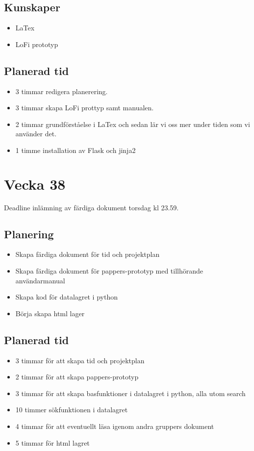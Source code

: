 \documentclass{TDP003mall}
\begin{document}
\subsection{Kunskaper}
\begin{itemize}
\item LaTex
\item LoFi prototyp
\end{itemize}

\subsection{Planerad tid}
\begin{itemize}
\item 3 timmar redigera planerering. 
\item 3 timmar skapa LoFi prottyp samt manualen. 
\item 2 timmar grundförståelse i LaTex och sedan lär vi oss mer under tiden som vi använder det. 
\item 1 timme  installation av Flask och jinja2
\end{itemize}

\section{Vecka 38}
Deadline inlämning av färdiga dokument torsdag kl 23.59.\\

\subsection{Planering}
\begin{itemize}
\item Skapa färdiga dokument för tid och projektplan
\item Skapa färdiga dokument för pappers-prototyp med tillhörande användarmanual 
\item Skapa kod för datalagret i python
\item Börja skapa html lager
\end{itemize}

\subsection{Planerad tid}
\begin{itemize}
\item 3 timmar för att skapa tid och projektplan
\item 2 timmar för att skapa pappers-prototyp
\item 3 timmar för att skapa basfunktioner i datalagret i python, alla utom search
\item 10 timmer sökfunktionen i datalagret
\item 4 timmar för att eventuellt läsa igenom andra gruppers dokument
\item 5 timmar för html lagret
\end{itemize}
\end{document}
